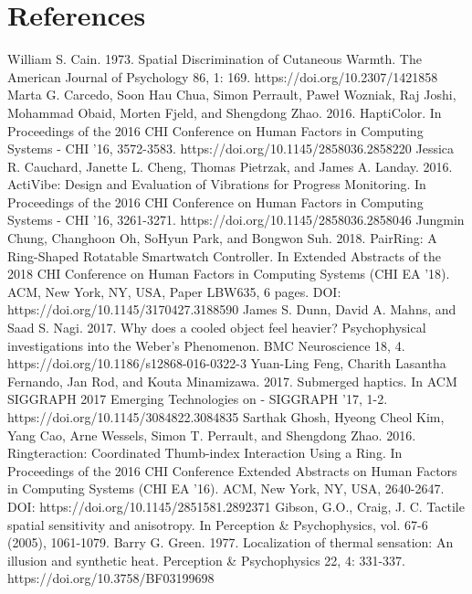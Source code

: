 \documentclass[preprint,12pt]{elsarticle}
\begin{document}
\section*{References}
\begin{thebibliography}{00}


William S. Cain. 1973. Spatial Discrimination of Cutaneous Warmth. The American Journal of Psychology 86, 1: 169. https://doi.org/10.2307/1421858
Marta G. Carcedo, Soon Hau Chua, Simon Perrault, Paweł Wozniak, Raj Joshi, Mohammad Obaid, Morten Fjeld, and Shengdong Zhao. 2016. HaptiColor. In Proceedings of the 2016 CHI Conference on Human Factors in Computing Systems - CHI '16, 3572-3583. https://doi.org/10.1145/2858036.2858220
Jessica R. Cauchard, Janette L. Cheng, Thomas Pietrzak, and James A. Landay. 2016. ActiVibe: Design and Evaluation of Vibrations for Progress Monitoring. In Proceedings of the 2016 CHI Conference on Human Factors in Computing Systems - CHI '16, 3261-3271. https://doi.org/10.1145/2858036.2858046
Jungmin Chung, Changhoon Oh, SoHyun Park, and Bongwon Suh. 2018. PairRing: A Ring-Shaped Rotatable Smartwatch Controller. In Extended Abstracts of the 2018 CHI Conference on Human Factors in Computing Systems (CHI EA '18). ACM, New York, NY, USA, Paper LBW635, 6 pages. DOI: https://doi.org/10.1145/3170427.3188590
James S. Dunn, David A. Mahns, and Saad S. Nagi. 2017. Why does a cooled object feel heavier? Psychophysical investigations into the Weber's Phenomenon. BMC Neuroscience 18, 4. https://doi.org/10.1186/s12868-016-0322-3
Yuan-Ling Feng, Charith Lasantha Fernando, Jan Rod, and Kouta Minamizawa. 2017. Submerged haptics. In ACM SIGGRAPH 2017 Emerging Technologies on - SIGGRAPH '17, 1-2. https://doi.org/10.1145/3084822.3084835
Sarthak Ghosh, Hyeong Cheol Kim, Yang Cao, Arne Wessels, Simon T. Perrault, and Shengdong Zhao. 2016. Ringteraction: Coordinated Thumb-index Interaction Using a Ring. In Proceedings of the 2016 CHI Conference Extended Abstracts on Human Factors in Computing Systems (CHI EA '16). ACM, New York, NY, USA, 2640-2647. DOI: https://doi.org/10.1145/2851581.2892371
Gibson, G.O., Craig, J. C. Tactile spatial sensitivity and anisotropy. In Perception \& Psychophysics, vol. 67-6 (2005), 1061-1079.
Barry G. Green. 1977. Localization of thermal sensation: An illusion and synthetic heat. Perception \& Psychophysics 22, 4: 331-337. https://doi.org/10.3758/BF03199698

\end{thebibliography}
\end{document}
